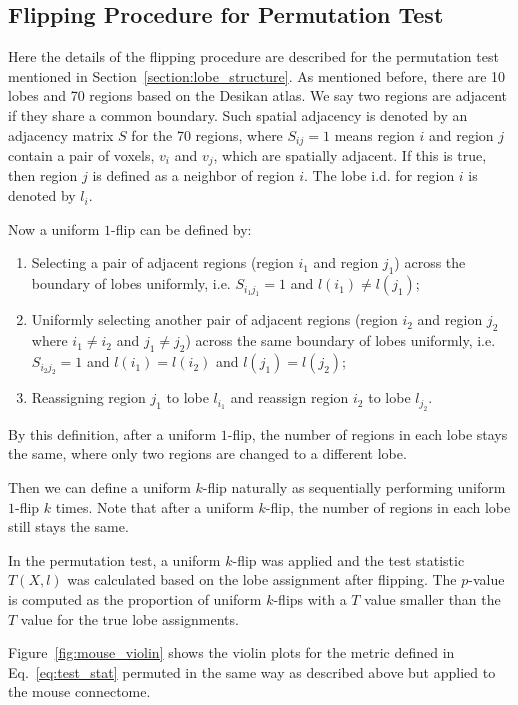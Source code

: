 \documentclass[journal,twoside,web]{ieeecolor}
\begin{document}
\subsection{Flipping Procedure for Permutation Test}
\label{section:testing}
%
Here the details of the flipping procedure are described for the permutation test mentioned in Section~\ref{section:lobe_structure}.
As mentioned before, there are 10 lobes and 70 regions based on the Desikan atlas.
We say two regions are adjacent if they share a common boundary. Such spatial adjacency is denoted by an adjacency matrix $S$ for the 70 regions, where $S_{ij} = 1$ means region $i$ and region $j$ contain a pair of voxels, $v_i$ and $v_j$, which are spatially adjacent.
If this is true, then region $j$ is defined as a neighbor of region $i$.
The lobe i.d. for region $i$ is denoted by $l_i$.

Now a uniform $1$-flip can  be defined by:
\begin{enumerate}
\item Selecting a pair of adjacent regions (region $i_1$ and region $j_1$) across the boundary of lobes uniformly, i.e. $S_{i_1 j_1} = 1$ and $l(i_1) \ne l(j_1)$;
\item Uniformly selecting another pair of adjacent regions (region $i_2$ and region $j_2$ where $i_1 \ne i_2$ and $j_1 \ne j_2$) across the same boundary of lobes uniformly, i.e. $S_{i_2 j_2} = 1$ and $l(i_1) = l(i_2)$ and $l(j_1) = l(j_2)$;
\item Reassigning region $j_1$ to lobe $l_{i_1}$ and reassign region $i_2$ to lobe $l_{j_2}$.
\end{enumerate}

By this definition, after a uniform $1$-flip, the number of regions in each lobe stays the same, where only two regions are changed to a different lobe.

Then we can define a uniform $k$-flip naturally as sequentially performing uniform $1$-flip $k$ times.
Note that after a uniform $k$-flip, the number of regions in each lobe still stays the same.

In the permutation test, a uniform $k$-flip was applied and the test statistic $T(X, l)$ was calculated based on the lobe assignment after flipping.
The $p$-value is computed as the proportion of uniform $k$-flips with a $T$ value smaller than the $T$ value for the true lobe assignments.


Figure~\ref{fig:mouse_violin} shows the violin plots for the metric defined in Eq.~\eqref{eq:test_stat} permuted in the same way as described above but applied to the mouse connectome.
\end{document}
